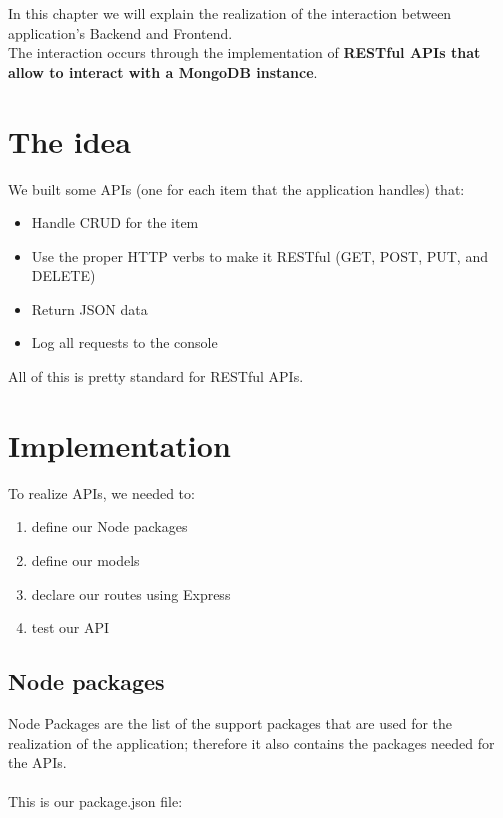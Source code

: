 
In this chapter we will explain the realization of the interaction between application's Backend and Frontend.
\\The interaction occurs through the implementation of \textbf{RESTful APIs that allow to interact with a MongoDB instance}.

\section{The idea}

We built some APIs (one for each item that the application handles) that:

\begin{itemize}
	\item Handle CRUD for the item
	\item Use the proper HTTP verbs to make it RESTful (GET, POST, PUT, and DELETE)
	\item Return JSON data
	\item Log all requests to the console
\end{itemize}

All of this is pretty standard for RESTful APIs.

\newpage

\section{Implementation}

To realize APIs, we needed to: 

\begin{enumerate}
	\item define our Node packages
	\item define our models
	\item declare our routes using Express
	\item test our API
\end{enumerate}

\subsection{Node packages}

Node Packages are the list of the support packages that are used for the realization of the application; therefore it also contains the packages needed for the APIs. 
\\
\\This is our package.json file:

